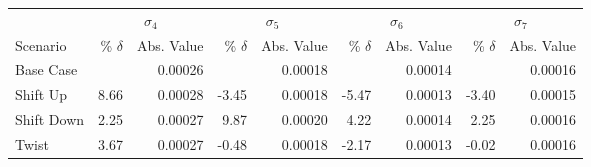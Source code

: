 \begin{table}[H]
	\centering
	\setlength{\tabcolsep}{5pt}
	\begin{threeparttable}
		\begin{tabular}{l *{4}{rr}}
			           & \multicolumn{2}{c}{$\sigma_4$} & \multicolumn{2}{c}{$\sigma_5$} & \multicolumn{2}{c}{$\sigma_6$} & \multicolumn{2}{c}{$\sigma_7$}                                                       \\
			\cmidrule(lr){2-3} \cmidrule(lr){4-5} \cmidrule(lr){6-7} \cmidrule(lr){8-9}
			Scenario   & \% $\delta$                    & Abs. Value                     & \% $\delta$                    & Abs. Value                     & \% $\delta$ & Abs. Value & \% $\delta$ & Abs. Value \\
			\midrule

			Base Case  &                                & 0.00026                        &                                & 0.00018                        &             & 0.00014    &             & 0.00016    \\
			Shift Up   & 8.66                           & 0.00028                        & -3.45                          & 0.00018                        & -5.47       & 0.00013    & -3.40       & 0.00015    \\
			Shift Down & 2.25                           & 0.00027                        & 9.87                           & 0.00020                        & 4.22        & 0.00014    & 2.25        & 0.00016    \\
			Twist      & 3.67                           & 0.00027                        & -0.48                          & 0.00018                        & -2.17       & 0.00013    & -0.02       & 0.00016    \\
			\bottomrule
		\end{tabular}
	\end{threeparttable}
\end{table}

